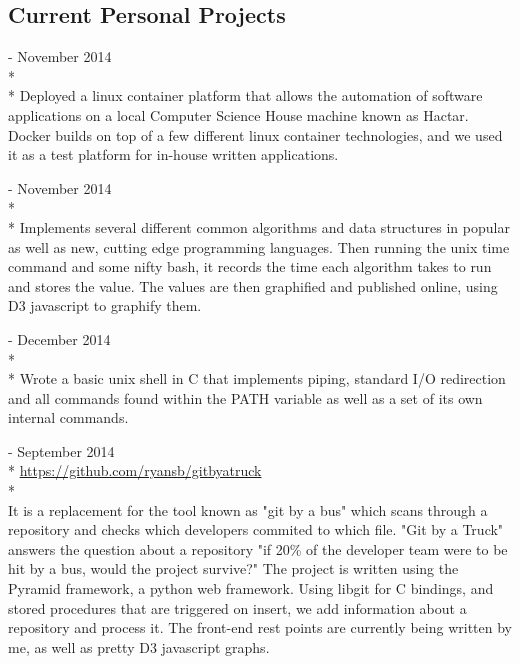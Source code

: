 \documentclass[a4paper,margin,line]{resume}
\newcommand{\rurl}[1]{\hfill {\footnotesize \url{#1}}}
\newcommand{\rdate}[1]{\hfill {\small #1}}
\renewcommand{\employer}[5]{\item[#1] - #2 \rdate{#3} \\* #4 \rurl{#5} \\*}
\begin{document}
\begin{resume}
\section{\mysidestyle Current Personal Projects}
    \begin{asparadesc}
       \employer{Deploying Docker}{November 2014}{}{}{}
       \small
       Deployed a linux container platform that allows the automation of
       software applications on a local Computer Science House machine known
       as Hactar. Docker builds on top of a few different linux container 
       technologies, and we used it as a test platform for in-house written 
       applications. 
       \normalsize
       \\
       \employer{Algorithmically}{November 2014}{}{}{}
       \small 
       Implements several different common algorithms and data structures in 
       popular as well as new, cutting edge programming languages. Then running
       the unix time command and some nifty bash, it records the time each
       algorithm takes to run and stores the value. The values are then
       graphified and published online, using D3 javascript to graphify them.
       \normalsize
       \\
       \employer{MyShell}{December 2014}{}{}{}
       \small
       Wrote a basic unix shell in C that implements piping, standard I/O
       redirection and all commands found within the PATH variable as 
       well as a set of its own internal commands.
       \normalsize
       \\
        \employer{Git by a Truck}{September 2014}{}{}{https://github.com/ryansb/gitbyatruck}
        \\
       \small
       It is a replacement for the tool known as "git by a bus" which scans
       through a repository and checks which developers commited to which file.
       "Git by a Truck" answers the question about a repository "if 20\% of the
       developer team were to be hit by a bus, would the project survive?" The
       project is written using the Pyramid framework, a python web framework. 
       Using libgit for C bindings, and stored procedures that are triggered 
       on insert, we add information about a repository and process it. The
       front-end rest points are currently being written by me, as well as pretty D3
       javascript graphs.
       \normalsize
    \end{asparadesc}


\end{resume}
\end{document}
